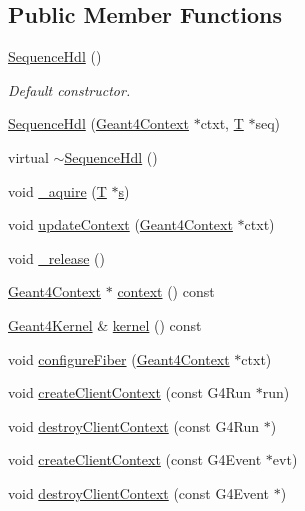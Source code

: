 \subsection*{Public Member Functions}
\begin{DoxyCompactItemize}
\item 
\hyperlink{class_d_d4hep_1_1_simulation_1_1_sequence_hdl_aeb88368d61e8f34a82e6acc1c8794521}{Sequence\+Hdl} ()
\begin{DoxyCompactList}\small\item\em Default constructor. \end{DoxyCompactList}\item 
\hyperlink{class_d_d4hep_1_1_simulation_1_1_sequence_hdl_a6a75a0ed136c559a8187ebcf6713a014}{Sequence\+Hdl} (\hyperlink{class_d_d4hep_1_1_simulation_1_1_geant4_context}{Geant4\+Context} $\ast$ctxt, \hyperlink{class_t}{T} $\ast$seq)
\item 
virtual \hyperlink{class_d_d4hep_1_1_simulation_1_1_sequence_hdl_af01dc42f94e773bcd01406fbcc178f4d}{$\sim$\+Sequence\+Hdl} ()
\item 
void \hyperlink{class_d_d4hep_1_1_simulation_1_1_sequence_hdl_afe240bb5982f0cdaedc001a3cc1a50da}{\+\_\+aquire} (\hyperlink{class_t}{T} $\ast$\hyperlink{_volumes_8cpp_a17ca6bfc8040d695d3cada22a4763d40}{s})
\item 
void \hyperlink{class_d_d4hep_1_1_simulation_1_1_sequence_hdl_a6f0b9120d430d93caafb6d3d9f360ecf}{update\+Context} (\hyperlink{class_d_d4hep_1_1_simulation_1_1_geant4_context}{Geant4\+Context} $\ast$ctxt)
\item 
void \hyperlink{class_d_d4hep_1_1_simulation_1_1_sequence_hdl_ad76a439f79bc1844bbcb33e3395c8454}{\+\_\+release} ()
\item 
\hyperlink{class_d_d4hep_1_1_simulation_1_1_geant4_context}{Geant4\+Context} $\ast$ \hyperlink{class_d_d4hep_1_1_simulation_1_1_sequence_hdl_acccabdfcac241cb5c7efdf92e549ded9}{context} () const
\item 
\hyperlink{class_d_d4hep_1_1_simulation_1_1_geant4_kernel}{Geant4\+Kernel} \& \hyperlink{class_d_d4hep_1_1_simulation_1_1_sequence_hdl_a89eb0b58f4614f5fd03a656e3b6da8da}{kernel} () const
\item 
void \hyperlink{class_d_d4hep_1_1_simulation_1_1_sequence_hdl_a4672c0e560cdc353b48c8025c9d3546f}{configure\+Fiber} (\hyperlink{class_d_d4hep_1_1_simulation_1_1_geant4_context}{Geant4\+Context} $\ast$ctxt)
\item 
void \hyperlink{class_d_d4hep_1_1_simulation_1_1_sequence_hdl_a6f817d21c75a96ad450c35fd4748d762}{create\+Client\+Context} (const G4\+Run $\ast$run)
\item 
void \hyperlink{class_d_d4hep_1_1_simulation_1_1_sequence_hdl_a0f4ca2107e2527947620c788fe60bc9a}{destroy\+Client\+Context} (const G4\+Run $\ast$)
\item 
void \hyperlink{class_d_d4hep_1_1_simulation_1_1_sequence_hdl_a45cfca253c17c4a89ef63d9367d4c9a4}{create\+Client\+Context} (const G4\+Event $\ast$evt)
\item 
void \hyperlink{class_d_d4hep_1_1_simulation_1_1_sequence_hdl_a8134448bdd2dd9d0e2f5d5834aa6a60f}{destroy\+Client\+Context} (const G4\+Event $\ast$)
\end{DoxyCompactItemize}
